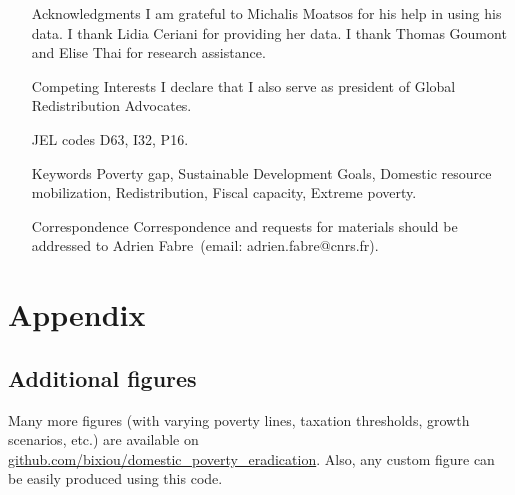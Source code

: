 \begin{itemize}
 \item[Acknowledgments] I am grateful to Michalis Moatsos for his help in using his data. I thank Lidia Ceriani for providing her data. I thank Thomas Goumont and Elise Thai for research assistance. 
 \item[Competing Interests] I declare that I also serve as president of Global Redistribution Advocates.
\item[JEL codes] D63, I32, P16.
\item[Keywords]  Poverty gap, Sustainable Development Goals, Domestic resource mobilization, Redistribution, Fiscal capacity, Extreme poverty.
 \item[Correspondence] Correspondence and requests for materials
should be addressed to Adrien Fabre~(email: adrien.fabre@cnrs.fr).\end{itemize}

\clearpage
\listoftables
\listoffigures

\appendix %
\renewcommand{\thetable}{A\arabic{table}}
\renewcommand{\thefigure}{A\arabic{figure}}
\setcounter{figure}{0}
\setcounter{table}{0}

\clearpage
\section{Appendix}
\subsection{Additional figures}

Many more figures (with varying poverty lines, taxation thresholds, growth scenarios, etc.) are available on \href{https://github.com/bixiou/domestic_poverty_eradication/tree/main/figures}{github.com/bixiou/domestic\_poverty\_eradication}. Also, any custom figure can be easily produced using this code.



